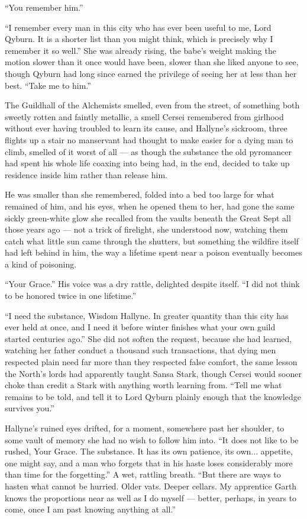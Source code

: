 “You remember him.”

“I remember every man in this city who has ever been useful to me, Lord Qyburn. It is a shorter list than you might think, which is precisely why I remember it so well.” She was already rising, the babe’s weight making the motion slower than it once would have been, slower than she liked anyone to see, though Qyburn had long since earned the privilege of seeing her at less than her best. “Take me to him.”

\sceneBreak

The Guildhall of the Alchemists smelled, even from the street, of something both sweetly rotten and faintly metallic, a smell Cersei remembered from girlhood without ever having troubled to learn its cause, and Hallyne’s sickroom, three flights up a stair no manservant had thought to make easier for a dying man to climb, smelled of it worst of all — as though the substance the old pyromancer had spent his whole life coaxing into being had, in the end, decided to take up residence inside him rather than release him.

He was smaller than she remembered, folded into a bed too large for what remained of him, and his eyes, when he opened them to her, had gone the same sickly green-white glow she recalled from the vaults beneath the Great Sept all those years ago — not a trick of firelight, she understood now, watching them catch what little sun came through the shutters, but something the wildfire itself had left behind in him, the way a lifetime spent near a poison eventually becomes a kind of poisoning.

“Your Grace.” His voice was a dry rattle, delighted despite itself. “I did not think to be honored twice in one lifetime.”

“I need the substance, Wisdom Hallyne. In greater quantity than this city has ever held at once, and I need it before winter finishes what your own guild started centuries ago.” She did not soften the request, because she had learned, watching her father conduct a thousand such transactions, that dying men respected plain need far more than they respected false comfort, the same lesson the North’s lords had apparently taught Sansa Stark, though Cersei would sooner choke than credit a Stark with anything worth learning from. “Tell me what remains to be told, and tell it to Lord Qyburn plainly enough that the knowledge survives you.”

Hallyne’s ruined eyes drifted, for a moment, somewhere past her shoulder, to some vault of memory she had no wish to follow him into. “It does not like to be rushed, Your Grace. The substance. It has its own patience, its own... appetite, one might say, and a man who forgets that in his haste loses considerably more than time for the forgetting.” A wet, rattling breath. “But there are ways to hasten what cannot be hurried. Older vats. Deeper cellars. My apprentice Garth knows the proportions near as well as I do myself — better, perhaps, in years to come, once I am past knowing anything at all.”

